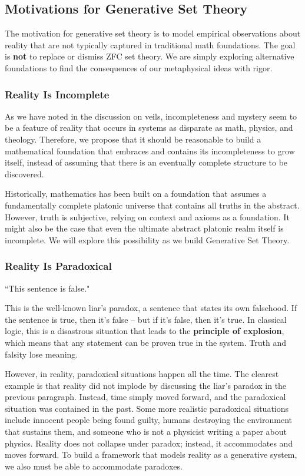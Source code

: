\documentclass[12pt]{article}
\begin{document}
\subsection{Motivations for Generative Set Theory}
The motivation for generative set theory is to model empirical observations about reality that are not typically captured in traditional math foundations. The goal is \textbf{not} to replace or dismiss ZFC set theory. We are simply exploring alternative foundations to find the consequences of our metaphysical ideas with rigor.

\subsubsection{Reality Is Incomplete}
As we have noted in the discussion on veils, incompleteness and mystery seem to be a feature of reality that occurs in systems as disparate as math, physics, and theology. Therefore, we propose that it should be reasonable to build a mathematical foundation that embraces and contains its incompleteness to grow itself, instead of assuming that there is an eventually complete structure to be discovered.

Historically, mathematics has been built on a foundation that assumes a fundamentally complete platonic universe that contains all truths in the abstract. However, truth is subjective, relying on context and axioms as a foundation. It might also be the case that even the ultimate abstract platonic realm itself is incomplete. We will explore this possibility as we build Generative Set Theory.

\subsubsection{Reality Is Paradoxical}
``This sentence is false."

This is the well-known liar's paradox, a sentence that states its own falsehood. If the sentence is true, then it's false -- but if it's false, then it's true. In classical logic, this is a disastrous situation that leads to the \textbf{principle of explosion}, which means that any statement can be proven true in the system. Truth and falsity lose meaning.

However, in reality, paradoxical situations happen all the time. The clearest example is that reality did not implode by discussing the liar's paradox in the previous paragraph. Instead, time simply moved forward, and the paradoxical situation was contained in the past. Some more realistic paradoxical situations include innocent people being found guilty, humans destroying the environment that sustains them, and someone who is not a physicist writing a paper about physics. Reality does not collapse under paradox; instead, it accommodates and moves forward. To build a framework that models reality as a generative system, we also must be able to accommodate paradoxes.
\end{document}
